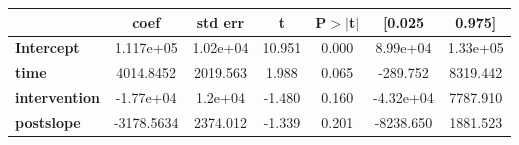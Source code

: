 \begin{center}
\begin{tabular}{lcccccc}
\toprule
                      & \textbf{coef} & \textbf{std err} & \textbf{t} & \textbf{P$> |$t$|$} & \textbf{[0.025} & \textbf{0.975]}  \\
\midrule
\textbf{Intercept}    &    1.117e+05  &     1.02e+04     &    10.951  &         0.000        &     8.99e+04    &     1.33e+05     \\
\textbf{time}         &    4014.8452  &     2019.563     &     1.988  &         0.065        &     -289.752    &     8319.442     \\
\textbf{intervention} &    -1.77e+04  &      1.2e+04     &    -1.480  &         0.160        &    -4.32e+04    &     7787.910     \\
\textbf{postslope}    &   -3178.5634  &     2374.012     &    -1.339  &         0.201        &    -8238.650    &     1881.523     \\
\bottomrule
\end{tabular}
\end{center}